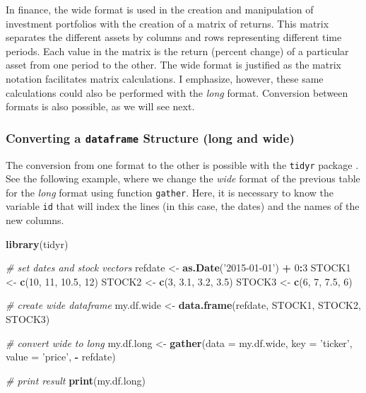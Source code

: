 \documentclass[11pt,]{book}
\newenvironment{Shaded}{\begin{snugshade}}{\end{snugshade}}
\newcommand{\KeywordTok}[1]{\textcolor[rgb]{0.27,0.27,0.27}{\textbf{#1}}}
\newcommand{\DataTypeTok}[1]{\textcolor[rgb]{0.27,0.27,0.27}{#1}}
\newcommand{\DecValTok}[1]{\textcolor[rgb]{0.06,0.06,0.06}{#1}}
\newcommand{\FloatTok}[1]{\textcolor[rgb]{0.06,0.06,0.06}{#1}}
\newcommand{\StringTok}[1]{\textcolor[rgb]{0.5,0.5,0.5}{#1}}
\newcommand{\CommentTok}[1]{\textcolor[rgb]{0.56,0.35,0.01}{\textit{#1}}}
\newcommand{\OperatorTok}[1]{\textcolor[rgb]{0.81,0.36,0.00}{\textbf{#1}}}
\newcommand{\NormalTok}[1]{#1}
\begin{document}
In finance, the wide format is used in the creation and manipulation of
investment portfolios with the creation of a matrix of returns. This
matrix separates the different assets by columns and rows representing
different time periods. Each value in the matrix is the return (percent
change) of a particular asset from one period to the other. The wide
format is justified as the matrix notation facilitates matrix
calculations. I emphasize, however, these same calculations could also
be performed with the \emph{long} format. Conversion between formats is
also possible, as we will see next.

\subsubsection{\texorpdfstring{Converting a \texttt{dataframe} Structure
(long and
wide)}{Converting a dataframe Structure (long and wide)}}\label{converting-a-dataframe-structure-long-and-wide}

The conversion from one format to the other is possible with the
\texttt{tidyr} package \citep{tidyr}. See the following example, where
we change the \emph{wide} format of the previous table for the
\emph{long} format using function \texttt{gather}. Here, it is necessary
to know the variable \texttt{id} that will index the lines (in this
case, the dates) and the names of the new columns. 

\begin{Shaded}
\begin{Highlighting}[]
\KeywordTok{library}\NormalTok{(tidyr)}

\CommentTok{# set dates and stock vectors}
\NormalTok{refdate <-}\StringTok{ }\KeywordTok{as.Date}\NormalTok{(}\StringTok{'2015-01-01'}\NormalTok{) }\OperatorTok{+}\StringTok{ }\DecValTok{0}\OperatorTok{:}\DecValTok{3}
\NormalTok{STOCK1 <-}\StringTok{ }\KeywordTok{c}\NormalTok{(}\DecValTok{10}\NormalTok{, }\DecValTok{11}\NormalTok{, }\FloatTok{10.5}\NormalTok{, }\DecValTok{12}\NormalTok{)}
\NormalTok{STOCK2 <-}\StringTok{ }\KeywordTok{c}\NormalTok{(}\DecValTok{3}\NormalTok{, }\FloatTok{3.1}\NormalTok{, }\FloatTok{3.2}\NormalTok{, }\FloatTok{3.5}\NormalTok{)}
\NormalTok{STOCK3 <-}\StringTok{ }\KeywordTok{c}\NormalTok{(}\DecValTok{6}\NormalTok{, }\DecValTok{7}\NormalTok{, }\FloatTok{7.5}\NormalTok{, }\DecValTok{6}\NormalTok{)}

\CommentTok{# create wide dataframe}
\NormalTok{my.df.wide <-}\StringTok{ }\KeywordTok{data.frame}\NormalTok{(refdate, STOCK1, STOCK2, STOCK3)}

\CommentTok{# convert wide to long}
\NormalTok{my.df.long <-}\StringTok{ }\KeywordTok{gather}\NormalTok{(}\DataTypeTok{data =}\NormalTok{ my.df.wide,}
                     \DataTypeTok{key =} \StringTok{'ticker'}\NormalTok{,}
                     \DataTypeTok{value =} \StringTok{'price'}\NormalTok{,}
                     \OperatorTok{-}\StringTok{ }\NormalTok{refdate)}

\CommentTok{# print result}
\KeywordTok{print}\NormalTok{(my.df.long)}
\end{Highlighting}
\end{Shaded}
\end{document}
